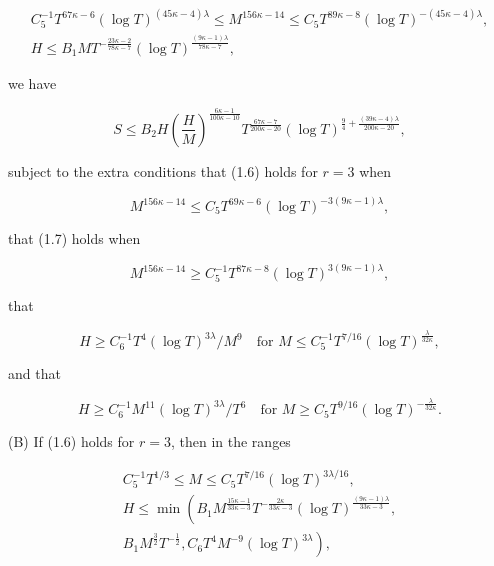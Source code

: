 \documentclass[10pt]{article}
\begin{document}
\begin{gather*}
C_{5}^{-1} T^{67 \kappa-6}(\log T)^{(45 \kappa-4) \lambda} \leqslant M^{156 \kappa-14} \leqslant C_{5} T^{89 \kappa-8}(\log T)^{-(45 \kappa-4) \lambda},  \tag{1.8}\\
H \leqslant B_{1} M T^{-\frac{23 \kappa-2}{78 \kappa-7}}(\log T)^{\frac{(9 \kappa-1) \lambda}{78 \kappa-7}}, \tag{1.9}
\end{gather*}


we have


\begin{equation*}
S \leqslant B_{2} H\left(\frac{H}{M}\right)^{\frac{6 \kappa-1}{100 \kappa-10}} T^{\frac{67 \kappa-7}{200 \kappa-20}}(\log T)^{\frac{9}{4}+\frac{(39 \kappa-4) \lambda}{200 \kappa-20}}, \tag{1.10}
\end{equation*}


subject to the extra conditions that (1.6) holds for $r=3$ when


\begin{equation*}
M^{156 \kappa-14} \leqslant C_{5} T^{69 \kappa-6}(\log T)^{-3(9 \kappa-1) \lambda}, \tag{1.11}
\end{equation*}


that (1.7) holds when


\begin{equation*}
M^{156 \kappa-14} \geqslant C_{5}^{-1} T^{87 \kappa-8}(\log T)^{3(9 \kappa-1) \lambda}, \tag{1.12}
\end{equation*}


that


\begin{equation*}
H \geqslant C_{6}^{-1} T^{4}(\log T)^{3 \lambda} / M^{9} \quad \text{for } M \leqslant C_{5}^{-1} T^{7 / 16}(\log T)^{\frac{\lambda}{32\kappa}}, \tag{1.13}
\end{equation*}


and that


\begin{equation*}
H \geqslant C_{6}^{-1} M^{11}(\log T)^{3 \lambda} / T^{6} \quad \text{for } M \geqslant C_{5} T^{9 / 16}(\log T)^{-\frac{\lambda}{32\kappa}}. \tag{1.14}
\end{equation*}


(B) If (1.6) holds for $r=3$, then in the ranges

\begin{gather*}
C_{5}^{-1} T^{1 / 3} \leqslant M \leqslant C_{5} T^{7 / 16}(\log T)^{3 \lambda / 16},  \tag{1.15}\\
H \leqslant \min \left(B_{1} M^{\frac{15 \kappa-1}{33 \kappa-3}} T^{-\frac{2 \kappa}{33 \kappa-3}}(\log T)^{\frac{(9 \kappa-1) \lambda}{33 \kappa-3}},\right. \\
\left.B_{1} M^{\frac{3}{2}} T^{-\frac{1}{2}}, C_{6} T^{4} M^{-9}(\log T)^{3 \lambda}\right), \tag{1.16}
\end{gather*}
\end{document}
